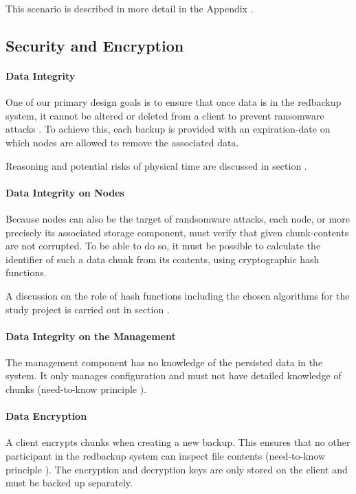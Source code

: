 This scenario is described in more detail in the Appendix .

\subsection{Security and Encryption}\label{sec:security-and-encryption}
\paragraph{Data Integrity} One of our primary design goals is to ensure that once data is in the redbackup system, it cannot be altered or deleted from a \gls{client} to prevent ransomware attacks \cite{young-cryptovirology}. To achieve this, each backup is provided with an \gls{expiration-date} on which \glspl{node} are allowed to remove the associated data. 

Reasoning and potential risks of physical time are discussed in section .

\paragraph{Data Integrity on Nodes} Because \glspl{node} can also be the target of randsomware attacks, each \gls{node}, or more precisely its associated \gls{storage} component, must verify that given \glspl{chunk-content} are not corrupted. To be able to do so, it must be possible to calculate the identifier of such a data \gls{chunk} from its contents, using cryptographic hash functions.

A discussion on the role of hash functions including the chosen algorithms for the study project is carried out in section .

\paragraph{Data Integrity on the Management} The \gls{management} component has no knowledge of the persisted data in the system. It only manages configuration and must not have detailed knowledge of \glspl{chunk} (need-to-know principle \cite{security-patterns}).

\paragraph{Data Encryption} A \gls{client} encrypts \glspl{chunk} when creating a new backup. This ensures that no other participant in the redbackup system can inspect file contents (need-to-know principle \cite{security-patterns}). The encryption and decryption keys are only stored on the \gls{client} and must be backed up separately.

